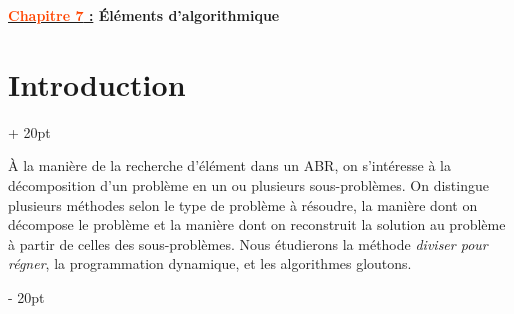 \documentclass[a4paper, 12pt, twoside]{article}
\renewcommand{\emph}{\textcolor{ff4500}}
\newcommand{\ind}[1][20pt]{\advance\leftskip + #1}
\newcommand{\deind}[1][20pt]{\advance\leftskip - #1}
\newenvironment{indt}[2][20pt]{#2 \par \ind[#1]}{\par \deind} %
\newcommand{\thetitle}[2]{\begin{center}\textbf{{\LARGE \underline{\emph{#1} :}} {\Large #2}}\end{center}}
\begin{document}
    
    
    \thetitle{Chapitre 7}{\'Eléments d'algorithmique}
    
    \tableofcontents
    \newpage
    
    
    \begin{indt}{\section{Introduction}}
        
        \`A la manière de la recherche d'élément dans un ABR, on s'intéresse à la décomposition d'un problème en un ou plusieurs sous-problèmes. On distingue plusieurs méthodes selon le type de problème à résoudre, la manière dont on décompose le problème et la manière dont on reconstruit la solution au problème à partir de celles des sous-problèmes. Nous étudierons la méthode \textit{diviser pour régner}, la programmation dynamique, et les algorithmes gloutons.
        
    \end{indt}
    
    \vspace{12pt}
    
\end{document}
